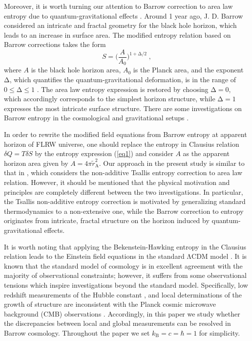 \documentclass[11pt,twocolumn]{article}
\begin{document}
Moreover, it is worth turning our attention to Barrow correction
to area law entropy due to quantum-gravitational effects
\cite{bw1}. Around 1 year ago, J. D. Barrow considered an
intricate and fractal geometry for the black hole horizon, which
leads to an increase in surface area. The modified entropy
relation based on Barrow corrections takes the form \cite{bw1}
\begin{equation} \label{eq1}
S=\Big(\frac{A}{A_0}\Big)^{1+\mathrm{\Delta}/2} \;,
\end{equation}
where $A$ is the black hole horizon area, $A_0$ is the Planck
area, and the exponent $\mathrm{\Delta}$, which quantifies the
quantum-gravitational deformation, is in the range of $0 \le \mathrm{\Delta} \le 1$
\cite{bw1,bw2,bw3}. The area law entropy expression is restored by
choosing $\mathrm{\Delta}=0$, which accordingly corresponds to the simplest
horizon structure, while $\mathrm{\Delta}=1$ expresses the most intricate
surface structure. There are some investigations on Barrow entropy
in the cosmological and gravitational setups
\cite{bw4,bw5,bw6,bw7,bw8,bw9,bw10,bw11,bw12,bw13,bw14,bw15,bw16,bw17,bw18,bw19,bw20}.

In order to rewrite the modified field equations from Barrow
entropy at apparent horizon of FLRW universe, one should replace
the entropy in Clausius relation $\delta Q=T \delta S$ by the
entropy expression (\ref{eq1}) and consider $A$ as the
apparent horizon area given by $A=4\pi \tilde{r}^2_\mathrm{A}$.
Our approach in the present study is similar to that in
\cite{ts12}, which considers the non-additive Tsallis entropy
correction to area law relation. However, it should be mentioned
that the physical motivation and principles are completely
different between the two investigations. In particular, the Tsallis
non-additive entropy correction is motivated by generalizing
standard thermodynamics to a non-extensive one, while the Barrow
correction to entropy originates from intricate, fractal structure
on the horizon induced by quantum-gravitational effects.

It is worth noting that applying the Bekenstein-Hawking
entropy in the Clausius relation leads to the Einstein field equations
in the standard $\mathrm{\Lambda}$CDM model \cite{grth3}. It is known that the
standard model of cosmology is in excellent agreement with the
majority of observational constraints; however, it suffers from
some observational tensions which inspire investigations beyond
the standard model. Specifically, low redshift measurements of the
Hubble constant \cite{H01,H02,H03,H04}, and local
determinations of the growth of structure \cite{s8} are
inconsistent with the Planck cosmic microwave background (CMB)
observations \cite{p18}. Accordingly, in this paper we study
whether the discrepancies between local and global measurements
can be resolved in Barrow cosmology. Throughout the paper we set
$k_\mathrm{B}=c=\hbar=1$ for simplicity.
\end{document}
